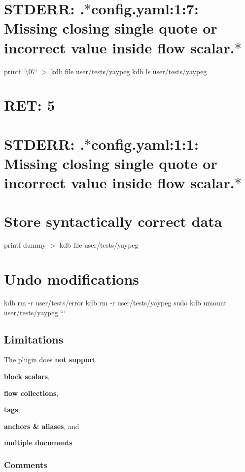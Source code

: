 \section*{S\+T\+D\+E\+RR\+: .$\ast$config.yaml\+:1\+:7\+: Missing closing single quote or incorrect value inside flow scalar.$\ast$}

printf \char`\"{}\textquotesingle{}\textbackslash{}07\textquotesingle{}\char`\"{} $>$ {\ttfamily kdb file user/tests/yaypeg} kdb ls user/tests/yaypeg \section*{R\+ET\+: 5}

\section*{S\+T\+D\+E\+RR\+: .$\ast$config.yaml\+:1\+:1\+: Missing closing single quote or incorrect value inside flow scalar.$\ast$}

\section*{Store syntactically correct data}

printf \textquotesingle{}dummy\textquotesingle{} $>$ {\ttfamily kdb file user/tests/yaypeg}

\section*{Undo modifications}

kdb rm -\/r user/tests/error kdb rm -\/r user/tests/yaypeg sudo kdb umount user/tests/yaypeg ```

\subsection*{Limitations}


\begin{DoxyItemize}
\item The plugin does {\bfseries not support}
\begin{DoxyItemize}
\item {\bfseries block scalars},
\item {\bfseries flow collections},
\item {\bfseries tags},
\item {\bfseries anchors \& aliases}, and
\item {\bfseries multiple documents}
\end{DoxyItemize}

\subsubsection*{Comments}
\end{DoxyItemize}

